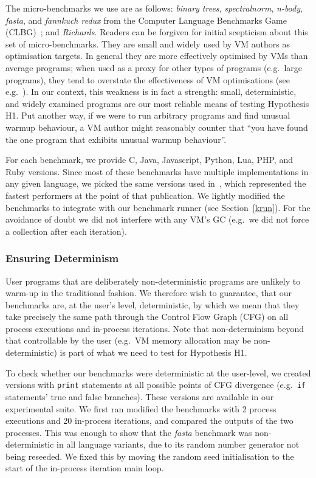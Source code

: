 \documentclass[preprint,numbers,10pt]{sigplanconf}
\newcommand{\binarytrees}{\emph{binary trees}\xspace}
\newcommand{\richards}{\emph{Richards}\xspace}
\newcommand{\spectralnorm}{\emph{spectralnorm}\xspace}
\newcommand{\nbody}{\emph{n-body}\xspace}
\newcommand{\fasta}{\emph{fasta}\xspace}
\newcommand{\fannkuch}{\emph{fannkuch redux}\xspace}
\begin{document}
The micro-benchmarks we use are as follows: \binarytrees, \spectralnorm, \nbody,
\fasta, and \fannkuch from the Computer Language Benchmarks Game (CLBG)~\cite{clbg}; and
\richards. Readers can be forgiven for initial scepticism about this set of micro-benchmarks.
They are small and widely
used by VM authors as optimisation targets. In general they are more effectively
optimised by VMs than average programs; when used as a proxy for other types
of programs (e.g.~large programs), they tend to overstate the effectiveness of
VM optimisations (see e.g.~\cite{ratanaworabhan09jsmeter}). In our context, this weakness is in fact a strength:
small, deterministic, and widely examined programs are our most
reliable means of testing Hypothesis H1. Put another way, if we were to run arbitrary programs
and find unusual warmup behaviour, a VM author might reasonably counter that
``you have found the one program that exhibits unusual warmup behaviour''.

For each benchmark, we provide C, Java, Javascript, Python, Lua, PHP,
and Ruby versions. Since most of these
benchmarks have multiple implementations in any given language, we picked
the same versions used in~\cite{bolz14impact}, which represented the fastest
performers at the point of that publication. We lightly modified
the benchmarks to integrate with our benchmark runner (see Section~\ref{krun}).
For the avoidance of doubt we did not interfere with any VM's GC (e.g.~we did not
force a collection after each iteration).


\subsubsection{Ensuring Determinism}

User programs that are deliberately non-deterministic programs are unlikely to
warm-up in the traditional fashion.
We therefore wish to guarantee, that our benchmarks are,
at the user's level, deterministic, by which we mean that they
take precisely the same path through the Control Flow Graph (CFG)
on all process executions and in-process iterations. Note that non-determinism
beyond that controllable by the user (e.g.~VM memory allocation may be
non-deterministic) is part of what we need to test for Hypothesis H1.

To check whether our benchmarks were deterministic at the user-level, we created
versions with \texttt{print} statements at all possible points of CFG
divergence (e.g.~\texttt{if} statements' true and false branches).
These versions are available in our experimental suite. We first ran modified
the benchmarks with 2 process executions and 20 in-process iterations,
and compared the outputs of the two processes. This was enough to show that the
\fasta benchmark was non-deterministic
in all language variants, due to its random number generator not being reseeded. We
fixed this by moving the random seed initialisation to the start
of the in-process iteration main loop.
\end{document}
